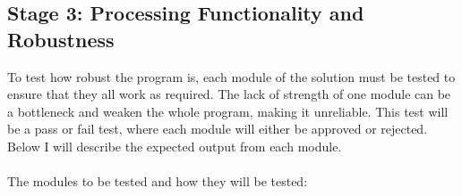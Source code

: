 \documentclass[11pt]{report}
\begin{document}
	\subsection{Stage 3: Processing Functionality and Robustness}
	
	
	
	
		To test how robust the program is, each module of the solution must be tested to ensure that  they all work as required. The lack of strength of one module can be a bottleneck and weaken the whole program, making it unreliable. This test will be a pass or fail test, where each module will either be approved or rejected. Below I will describe the expected output from each module.
		\\\\
		\noindent
		The modules to be tested and how they will be tested:
\end{document}
